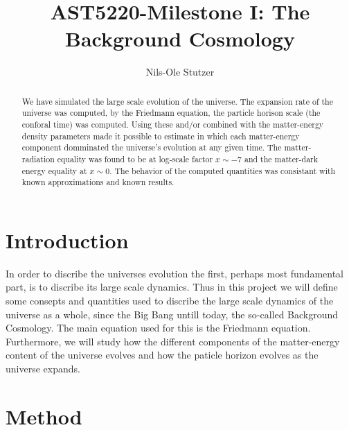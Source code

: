 \documentclass[twocolumn]{aastex62}
\begin{document}
\title{\Large AST5220-Milestone I: The Background Cosmology}

\author{Nils-Ole Stutzer}

\begin{abstract}
    We have simulated the large scale evolution of the universe. The expansion
    rate of the universe was computed, by the Friedmann equation, the particle
    horison scale (the conforal time) was computed. Using these and/or combined with the
    matter-energy density parameters made it  possible to estimate in which each
    matter-energy component domminated the universe's evolution at any given
    time. The matter-radiation equality was found to be at log-scale factor
    $x\sim -7$ and the matter-dark energy equality at $x\sim 0$. The behavior of
    the computed quantities was consistant with known approximations and known results.
\end{abstract}

\section{Introduction} \label{sec:Intro}
In order to discribe the universes evolution the first, perhaps most fundamental
part, is to discribe its large scale dynamics. Thus in this project we will define some consepts and quantities used to discribe the
large scale dynamics of the universe as a whole, since the Big Bang untill
today, the so-called Background Cosmology. The main equation used for this is
the Friedmann equation. Furthermore, we will study how the different components
of the matter-energy content of the universe evolves and how the paticle horizon
evolves as the universe expands.


\section{Method} \label{sec:Method}
\end{document}
